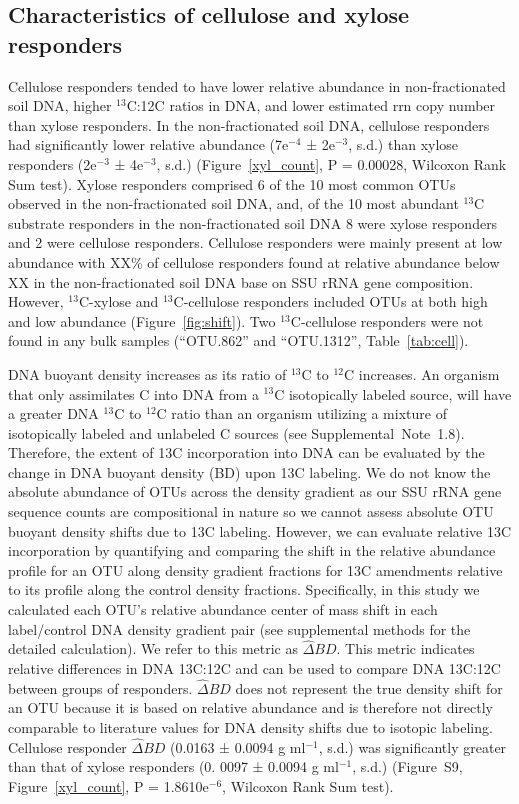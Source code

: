 \subsection{Characteristics of cellulose and xylose responders}
Cellulose responders tended to have lower relative abundance in
non-fractionated soil DNA, higher $^{13}$C:12C ratios in DNA, and lower estimated
rrn copy number than xylose responders. In the non-fractionated soil DNA,
cellulose responders had significantly lower relative abundance (7e$^{-4}$
± 2e$^{-3}$, s.d.) than xylose responders (2e$^{-3}$ ± 4e$^{-3}$, s.d.) (Figure~\ref{xyl_count},
P = 0.00028, Wilcoxon Rank Sum test). Xylose responders comprised 6 of the 10
most common OTUs observed in the non-fractionated soil DNA, and, of the 10
most abundant $^{13}$C substrate responders in the non-fractionated soil DNA
8 were xylose responders and 2 were cellulose responders. Cellulose responders
were mainly present at low abundance with XX\% of cellulose responders found at
relative abundance below XX in the non-fractionated soil DNA base on SSU rRNA
gene composition. However, $^{13}$C-xylose and $^{13}$C-cellulose responders
included OTUs at both high and low abundance (Figure~\ref{fig:shift}). Two
$^{13}$C-cellulose responders were not found in any bulk samples (``OTU.862''
and ``OTU.1312'', Table~\ref{tab:cell}).

DNA buoyant density increases as its ratio of $^{13}$C to $^{12}$C increases.
An organism that only assimilates C into DNA from a $^{13}$C isotopically
labeled source, will have a greater DNA $^{13}$C to $^{12}$C ratio 
than an organism utilizing a mixture of isotopically labeled and unlabeled
C sources (see Supplemental~Note~1.8). Therefore, the extent of 13C
incorporation into DNA can be evaluated by the change in DNA buoyant density
(BD) upon 13C labeling. We do not know the absolute abundance of OTUs across
the density gradient as our SSU rRNA gene sequence counts are compositional in
nature so we cannot assess absolute OTU buoyant density shifts due to 13C
labeling. However, we can evaluate relative 13C incorporation by quantifying
and comparing the shift in the relative abundance profile for an OTU along
density gradient fractions for 13C amendments relative to its profile along the
control density fractions. Specifically, in this study we calculated each OTU's
relative abundance center of mass shift in each label/control DNA density
gradient pair (see supplemental methods for the detailed calculation). We refer
to this metric as $\hat{\Delta}BD$. This metric indicates relative differences
in DNA 13C:12C and can be used to compare DNA 13C:12C between groups of
responders. $\hat{\Delta}BD$ does not represent the true density shift for an
OTU because it is based on relative abundance and is therefore not directly
comparable to literature values for DNA density shifts due to isotopic
labeling. Cellulose responder $\hat{\Delta}BD$ (0.0163 ± 0.0094 g ml$^{-1}$, s.d.)
was significantly greater than that of xylose responders (0. 0097 ± 0.0094
g ml$^{-1}$, s.d.) (Figure S9, Figure~\ref{xyl_count}, P = 1.8610e$^{-6}$, Wilcoxon Rank Sum test). 

